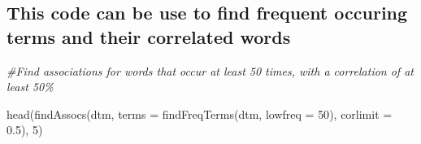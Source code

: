 \documentclass[
]{article}
\newenvironment{Shaded}{\begin{snugshade}}{\end{snugshade}}
\newcommand{\AttributeTok}[1]{\textcolor[rgb]{0.77,0.63,0.00}{#1}}
\newcommand{\CommentTok}[1]{\textcolor[rgb]{0.56,0.35,0.01}{\textit{#1}}}
\newcommand{\DecValTok}[1]{\textcolor[rgb]{0.00,0.00,0.81}{#1}}
\newcommand{\FloatTok}[1]{\textcolor[rgb]{0.00,0.00,0.81}{#1}}
\newcommand{\FunctionTok}[1]{\textcolor[rgb]{0.00,0.00,0.00}{#1}}
\newcommand{\NormalTok}[1]{#1}
\begin{document}
\hypertarget{this-code-can-be-use-to-find-frequent-occuring-terms-and-their-correlated-words}{%
\subsection{This code can be use to find frequent occuring terms and
their correlated
words}\label{this-code-can-be-use-to-find-frequent-occuring-terms-and-their-correlated-words}}

\begin{Shaded}
\begin{Highlighting}[]
\CommentTok{\#Find associations for words that occur at least 50 times, with a correlation of at least 50\%}

\FunctionTok{head}\NormalTok{(}\FunctionTok{findAssocs}\NormalTok{(dtm, }\AttributeTok{terms =} \FunctionTok{findFreqTerms}\NormalTok{(dtm, }\AttributeTok{lowfreq =} \DecValTok{50}\NormalTok{), }\AttributeTok{corlimit =} \FloatTok{0.5}\NormalTok{), }\DecValTok{5}\NormalTok{)}
\end{Highlighting}
\end{Shaded}
\end{document}
